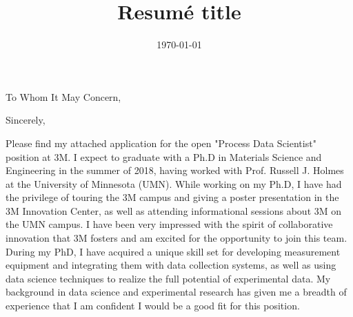 \documentclass[11pt,a4paper,roman]{moderncv}        %
\title{Resumé title}                               %
\newcommand{\company}{3M}
\newcommand{\shortcompany}{3M}
\begin{document}
\date{\today}
\opening{To Whom It May Concern,}
\closing{Sincerely,}
\makelettertitle
\justify
Please find my attached application for the open "Process Data Scientist" position at \company{}.
I expect to graduate with a Ph.D in Materials Science and Engineering in the summer of 2018, having worked with Prof. Russell J. Holmes at the University of Minnesota (UMN).
While working on my Ph.D, I have had the privilege of touring the \shortcompany{}  campus and giving a poster presentation in the 3M Innovation Center, as well as attending informational sessions about \company{} on the UMN campus.
I have been very impressed with the spirit of collaborative innovation that \company{} fosters and am excited for the opportunity to join this team.
During my PhD, I have acquired a unique skill set for developing measurement equipment and integrating them with data collection systems, as well as using data science techniques to realize the full potential of experimental data.
My background in data science and experimental research has given me a breadth of experience that I am confident I would be a good fit for this position. 

\end{document}
